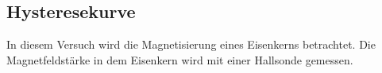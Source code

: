 \subsection{Hysteresekurve}
In diesem Versuch wird die Magnetisierung eines Eisenkerns betrachtet.
Die Magnetfeldstärke in dem Eisenkern wird mit einer Hallsonde gemessen.%




